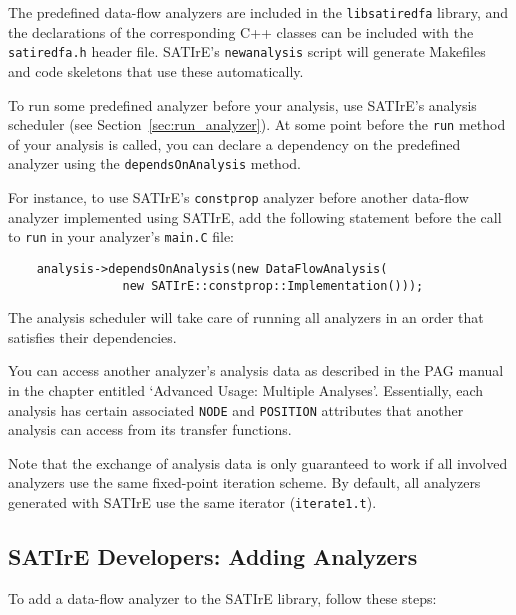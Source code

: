 \documentclass[a4paper,12pt]{report}
\begin{document}
The predefined data-flow analyzers are included in the \texttt{libsatiredfa}
library, and the declarations of the corresponding C++ classes can be
included with the \texttt{satiredfa.h} header file. SATIrE's
\texttt{newanalysis} script will generate Makefiles and code skeletons that
use these automatically.

To run some predefined analyzer before your analysis, use SATIrE's analysis
scheduler (see Section~\ref{sec:run_analyzer}). At some point before the
\texttt{run} method of your analysis is called, you can declare a dependency
on the predefined analyzer using the \texttt{dependsOnAnalysis} method.

For instance, to use SATIrE's \texttt{constprop} analyzer before another
data-flow analyzer implemented using SATIrE, add the following statement
before the call to \texttt{run} in your analyzer's \texttt{main.C} file:

\begin{verbatim}
    analysis->dependsOnAnalysis(new DataFlowAnalysis(
                new SATIrE::constprop::Implementation()));
\end{verbatim}

The analysis scheduler will take care of running all analyzers in an order
that satisfies their dependencies.

You can access another analyzer's analysis data as described in the PAG
manual in the chapter entitled `Advanced Usage: Multiple Analyses'.
Essentially, each analysis has certain associated \texttt{NODE} and
\texttt{POSITION} attributes that another analysis can access from its
transfer functions.

Note that the exchange of analysis data is only guaranteed to work if all
involved analyzers use the same fixed-point iteration scheme. By default,
all analyzers generated with SATIrE use the same iterator
(\texttt{iterate1.t}).

\subsection{SATIrE Developers: Adding Analyzers}
\label{sec:analysis_dataflow_add}

To add a data-flow analyzer to the SATIrE library, follow these steps:
\end{document}
